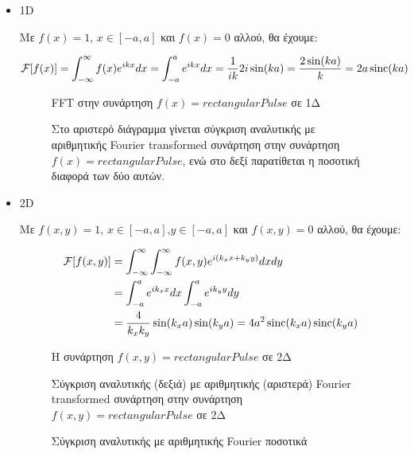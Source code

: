 \begin{itemize}
\item 1D

Με $f(x)=1$, $x\in [-a,a]$ και $f(x)=0$ αλλού, θα έχουμε:

\begin{align*}
\mathcal{F}[f(x)]&= \int_{-\infty}^{\infty} f(x) e^{ik x}dx = \int_{-a}^{a} e^{ik x}dx =\frac{1}{ik}2i \sin(k a)=\frac{2\sin(k a)}{k}=2a\operatorname{sinc}(ka)
\end{align*}

\newpage

\begin{figure}[htp]
\centering
{}\caption{FFT στην συνάρτηση $f(x)=rectangularPulse$ σε 1Δ}\label{fig:8}
\end{figure}

\begin{figure}[htp]
\centering
{}\caption{Στο αριστερό διάγραμμα γίνεται σύγκριση αναλυτικής με αριθμητικής Fourier transformed συνάρτηση στην συνάρτηση $f(x)=rectangularPulse$, ενώ στο δεξί παρατίθεται η ποσοτική διαφορά των δύο αυτών.}\label{fig:9}
\end{figure}

\clearpage

\item 2D

Με $f(x,y)=1$, $x\in [-a,a]$,$y\in [-a,a]$ και $f(x,y)=0$ αλλού, θα έχουμε:

\begin{align*}
\mathcal{F}[f(x,y)]&=\int_{-\infty}^{\infty}\int_{-\infty}^{\infty} f(x,y) e^{i(k_{x} x+k_{y} y)}dxdy\\&= \int_{-a}^{a} e^{ik_{x} x}dx \int_{-a}^{a} e^{ik_{y} y}dy\\&= \frac{4}{k_{x}k_{y}} \sin(k_{x}a)\sin(k_{y}a)=4a^{2}\operatorname{sinc}(k_{x}a)\operatorname{sinc}(k_{y}a)
\end{align*}


\begin{figure}[htp]
\centering
{}\caption{Η συνάρτηση $f(x,y)=rectangularPulse$ σε 2Δ}\label{fig:10}
\end{figure}

\newpage

\begin{figure}[htp]
\centering
{}\caption{Σύγκριση αναλυτικής (δεξιά) με αριθμητικής (αριστερά) Fourier transformed συνάρτηση στην συνάρτηση $f(x,y)=rectangularPulse$ σε 2Δ}\label{fig:11}
\end{figure}



\begin{figure}[htp]
\centering
{}\caption{ Σύγκριση αναλυτικής με αριθμητικής Fourier ποσοτικά}\label{fig:12}
\end{figure}
\clearpage

\end{itemize}


